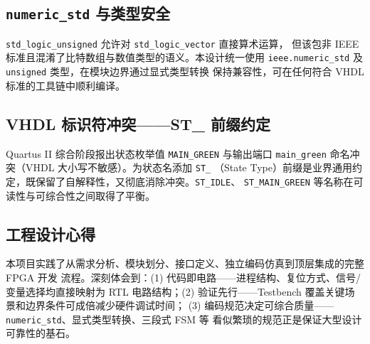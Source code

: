 \documentclass[12pt,a4paper]{ctexart}
\begin{document}
\subsection{\texttt{numeric\_std} 与类型安全}

\texttt{std\_logic\_unsigned} 允许对 \texttt{std\_logic\_vector} 直接算术运算，
但该包非 IEEE 标准且混淆了比特数组与数值类型的语义。本设计统一使用
\texttt{ieee.numeric\_std} 及 \texttt{unsigned} 类型，在模块边界通过显式类型转换
保持兼容性，可在任何符合 VHDL 标准的工具链中顺利编译。

\subsection{VHDL 标识符冲突——ST\_ 前缀约定}

Quartus II 综合阶段报出状态枚举值 \texttt{MAIN\_GREEN} 与输出端口
\texttt{main\_green} 命名冲突（VHDL 大小写不敏感）。为状态名添加 \texttt{ST\_}
（State Type）前缀是业界通用约定，既保留了自解释性，又彻底消除冲突。\texttt{ST\_IDLE}、
\texttt{ST\_MAIN\_GREEN} 等名称在可读性与可综合性之间取得了平衡。

\subsection{工程设计心得}

本项目实践了从需求分析、模块划分、接口定义、独立编码仿真到顶层集成的完整 FPGA 开发
流程。深刻体会到：(1) 代码即电路——进程结构、复位方式、信号/变量选择均直接映射为
RTL 电路结构；(2) 验证先行——Testbench 覆盖关键场景和边界条件可成倍减少硬件调试时间；
(3) 编码规范决定可综合质量——\texttt{numeric\_std}、显式类型转换、三段式 FSM 等
看似繁琐的规范正是保证大型设计可靠性的基石。
\end{document}
